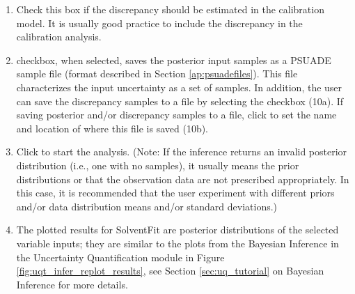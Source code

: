 \begin{enumerate}
\item {}  Check this box if the discrepancy should be estimated in the calibration model.  It is usually good practice to include the discrepancy in the calibration analysis.

\item {} checkbox, when selected, saves the posterior input samples as a PSUADE sample file (format described in Section \ref{ap:psuadefiles}). This file characterizes the input uncertainty as a set of samples. %
In addition, the user can save the discrepancy samples to a file by selecting the checkbox  (10a).  If saving posterior and/or discrepancy samples to a file, click  to set the name and location of where this file is saved (10b).

\item Click  to start the analysis. (Note: If the inference returns an invalid posterior distribution (i.e., one with no samples), it
	usually means the prior distributions or that the observation data are not prescribed appropriately. In this case, it is
	recommended that the user experiment with different priors and/or data distribution means and/or standard deviations.)
	
\item The plotted results for SolventFit are posterior distributions of the selected variable inputs; they are similar to the plots from the Bayesian Inference in the Uncertainty Quantification module in Figure \ref{fig:uqt_infer_replot_results}, see Section \ref{sec:uq_tutorial} on Bayesian Inference for more details.  	

\end{enumerate}
